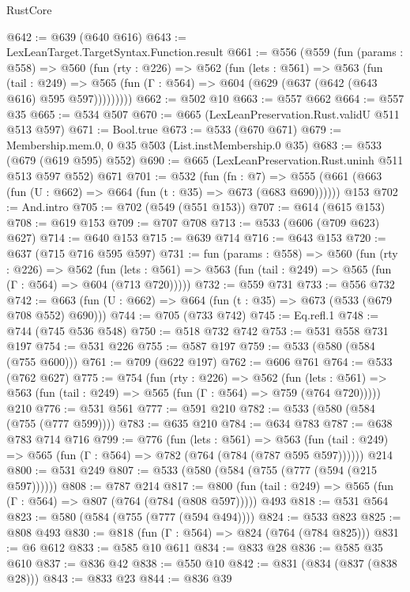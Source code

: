 \begin{lexlean}{RustCore}
\begin{coremodule}
@642 := @639 (@640 @616)
@643 := LexLeanTarget.TargetSyntax.Function.result
@661 := @556
    (@559
      (fun (params : @558) =>
      @560
        (fun (rty : @226) =>
        @562
          (fun (lets : @561) =>
          @563
            (fun (tail : @249) =>
            @565 (fun (Γ : @564) => @604 (@629 (@637 (@642 (@643 @616) @595 @597)))))))))
@662 := @502 @10
@663 := @557 @662
@664 := @557 @35
@665 := @534 @507
@670 := @665 (LexLeanPreservation.Rust.validU @511 @513 @597)
@671 := Bool.true
@673 := @533 (@670 @671)
@679 := Membership.mem.{0, 0} @35 @503 (List.instMembership.{0} @35)
@683 := @533 (@679 (@619 @595) @552)
@690 := @665 (LexLeanPreservation.Rust.uninh @511 @513 @597 @552) @671
@701 := @532
    (fun (fn : @7) =>
    @555 (@661 (@663 (fun (U : @662) => @664 (fun (t : @35) => @673 (@683 @690))))))
    @153
@702 := And.intro
@705 := @702 (@549 (@551 @153))
@707 := @614 (@615 @153)
@708 := @619 @153
@709 := @707 @708
@713 := @533 (@606 (@709 @623) @627)
@714 := @640 @153
@715 := @639 @714
@716 := @643 @153
@720 := @637 (@715 @716 @595 @597)
@731 := fun (params : @558) =>
  @560
    (fun (rty : @226) =>
    @562
      (fun (lets : @561) => @563 (fun (tail : @249) => @565 (fun (Γ : @564) => @604 (@713 @720)))))
@732 := @559 @731
@733 := @556 @732
@742 := @663 (fun (U : @662) => @664 (fun (t : @35) => @673 (@533 (@679 @708 @552) @690)))
@744 := @705 (@733 @742)
@745 := Eq.refl.{1}
@748 := @744 (@745 @536 @548)
@750 := @518 @732 @742
@753 := @531 @558 @731 @197
@754 := @531 @226
@755 := @587 @197
@759 := @533 (@580 (@584 (@755 @600)))
@761 := @709 (@622 @197)
@762 := @606 @761
@764 := @533 (@762 @627)
@775 := @754
    (fun (rty : @226) =>
    @562
      (fun (lets : @561) => @563 (fun (tail : @249) => @565 (fun (Γ : @564) => @759 (@764 @720)))))
    @210
@776 := @531 @561
@777 := @591 @210
@782 := @533 (@580 (@584 (@755 (@777 @599))))
@783 := @635 @210
@784 := @634 @783
@787 := @638 @783 @714 @716
@799 := @776
    (fun (lets : @561) =>
    @563 (fun (tail : @249) => @565 (fun (Γ : @564) => @782 (@764 (@784 (@787 @595 @597))))))
    @214
@800 := @531 @249
@807 := @533 (@580 (@584 (@755 (@777 (@594 (@215 @597))))))
@808 := @787 @214
@817 := @800 (fun (tail : @249) => @565 (fun (Γ : @564) => @807 (@764 (@784 (@808 @597))))) @493
@818 := @531 @564
@823 := @580 (@584 (@755 (@777 (@594 @494))))
@824 := @533 @823
@825 := @808 @493
@830 := @818 (fun (Γ : @564) => @824 (@764 (@784 @825)))
@831 := @6 @612
@833 := @585 @10 @611
@834 := @833 @28
@836 := @585 @35 @610
@837 := @836 @42
@838 := @550 @10
@842 := @831 (@834 (@837 (@838 @28)))
@843 := @833 @23
@844 := @836 @39

\end{coremodule}
\end{lexlean}

